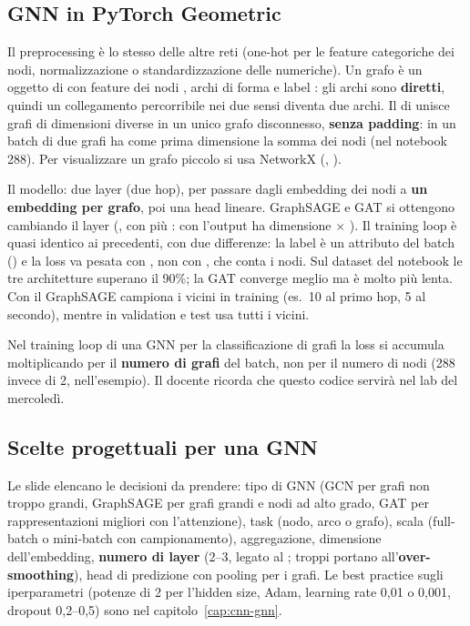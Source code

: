 \subsection{GNN in PyTorch Geometric}
Il preprocessing è lo stesso delle altre reti (one-hot per le feature categoriche dei nodi, normalizzazione
o standardizzazione delle numeriche). Un grafo è un oggetto  di  con
feature dei nodi , archi  di forma \code{[2, n\_archi]} e label : gli archi
sono \textbf{diretti}, quindi un collegamento percorribile nei due sensi diventa due archi. Il
 di  unisce grafi di dimensioni diverse in un unico grafo
disconnesso, \textbf{senza padding}: in un batch di due grafi  ha come prima dimensione la somma dei
nodi (nel notebook 288). Per visualizzare un grafo piccolo si usa NetworkX (,
).

Il modello: due layer  (due hop),  per passare dagli embedding dei
nodi a \textbf{un embedding per grafo}, poi una head lineare. GraphSAGE e GAT si ottengono cambiando il
layer (,  con più : con  l'output ha dimensione
 $\times$ ). Il training loop è quasi identico ai precedenti, con due
differenze: la label è un attributo del batch () e la loss va pesata con
, non con , che conta i nodi. Sul dataset del notebook le tre
architetture superano il 90\%; la GAT converge meglio ma è molto più lenta. Con il 
GraphSAGE campiona i vicini in training (es.\ 10 al primo hop, 5 al secondo), mentre in validation e test
usa tutti i vicini.

\begin{attenzione}
Nel training loop di una GNN per la classificazione di grafi la loss si accumula moltiplicando per il
\textbf{numero di grafi} del batch, non per il numero di nodi (288 invece di 2, nell'esempio). Il docente
ricorda che questo codice servirà nel lab del mercoledì.
\end{attenzione}

\subsection{Scelte progettuali per una GNN}
Le slide elencano le decisioni da prendere: tipo di GNN (GCN per grafi non troppo grandi, GraphSAGE per grafi
grandi e nodi ad alto grado, GAT per rappresentazioni migliori con l'attenzione), task (nodo, arco o grafo),
scala (full-batch o mini-batch con campionamento), aggregazione, dimensione dell'embedding, \textbf{numero di
layer} (2--3, legato al ; troppi portano all'\textbf{over-smoothing}), head di predizione
con pooling per i grafi. Le best practice sugli iperparametri (potenze di 2 per l'hidden size, Adam,
learning rate 0,01 o 0,001, dropout 0,2--0,5) sono nel capitolo~\ref{cap:cnn-gnn}.

